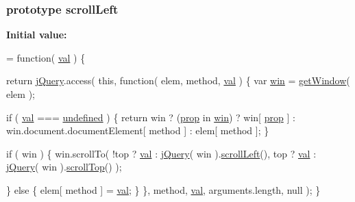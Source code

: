 \subsubsection[{scroll\+Left}]{ {\bf prototype} scroll\+Left}\label{jquery-1_810_82-vsdoc_8js_accc573ddf4124d723e9a6da272bb24f2}
{\bfseries Initial value\+:}
\begin{DoxyCode}
= \textcolor{keyword}{function}( \hyperlink{jquery-1_810_82-vsdoc_8js_a0888cacd53defa08fbb4972d54ece4b0}{val} ) \{


        \textcolor{keywordflow}{return} \hyperlink{jquery-1_810_82-vsdoc_8js_add5237586d970a38a81f990e8eb28c6c}{jQuery}.access( \textcolor{keyword}{this}, \textcolor{keyword}{function}( elem, method, \hyperlink{jquery-1_810_82-vsdoc_8js_a0888cacd53defa08fbb4972d54ece4b0}{val} ) \{
            var \hyperlink{_bibabook_2_scripts_2respond_8js_a0d799b5d86c2a73eb9d6d34a1a836797}{win} = \hyperlink{_bibabook_2_scripts_2jquery-1_810_82_8js_ab8e6e1fb3b8b51b6afe437c63df0e09f}{getWindow}( elem );

            \textcolor{keywordflow}{if} ( \hyperlink{jquery-1_810_82-vsdoc_8js_a0888cacd53defa08fbb4972d54ece4b0}{val} === \hyperlink{jquery-1_810_82-vsdoc_8js_a08113a236cc18d2a9d5ce27e638012be}{undefined} ) \{
                \textcolor{keywordflow}{return} win ? (\hyperlink{jquery-1_810_82-vsdoc_8js_af17be84954030af6c2286f5da385d41b}{prop} in \hyperlink{_bibabook_2_scripts_2respond_8js_a0d799b5d86c2a73eb9d6d34a1a836797}{win}) ? win[ \hyperlink{jquery-1_810_82-vsdoc_8js_af17be84954030af6c2286f5da385d41b}{prop} ] :
                    win.document.documentElement[ method ] :
                    elem[ method ];
            \}

            \textcolor{keywordflow}{if} ( win ) \{
                win.scrollTo(
                    !top ? \hyperlink{jquery-1_810_82-vsdoc_8js_a0888cacd53defa08fbb4972d54ece4b0}{val} : \hyperlink{jquery-1_810_82-vsdoc_8js_add5237586d970a38a81f990e8eb28c6c}{jQuery}( win ).\hyperlink{jquery-1_810_82-vsdoc_8js_accc573ddf4124d723e9a6da272bb24f2}{scrollLeft}(),
                    top ? \hyperlink{jquery-1_810_82-vsdoc_8js_a0888cacd53defa08fbb4972d54ece4b0}{val} : \hyperlink{jquery-1_810_82-vsdoc_8js_add5237586d970a38a81f990e8eb28c6c}{jQuery}( win ).\hyperlink{jquery-1_810_82-vsdoc_8js_a1b81b50a7190916ff4f07febc824b85d}{scrollTop}()
                );

            \} \textcolor{keywordflow}{else} \{
                elem[ method ] = \hyperlink{jquery-1_810_82-vsdoc_8js_a0888cacd53defa08fbb4972d54ece4b0}{val};
            \}
        \}, method, \hyperlink{jquery-1_810_82-vsdoc_8js_a0888cacd53defa08fbb4972d54ece4b0}{val}, arguments.length, null );
    \}
\end{DoxyCode}
\hypertarget{jquery-1_810_82-vsdoc_8js_a1b81b50a7190916ff4f07febc824b85d}{}
